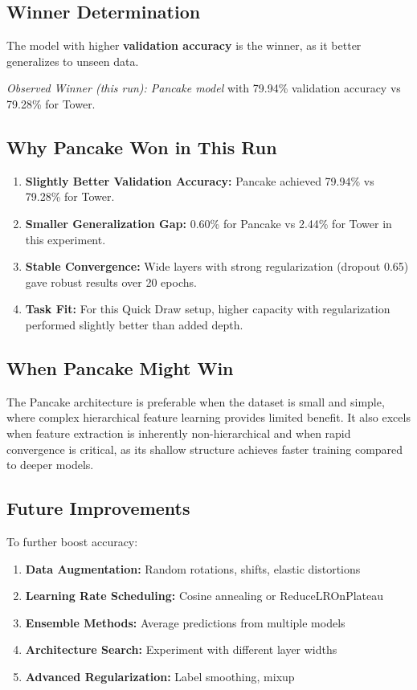 \documentclass[11pt]{article}
\begin{document}
\subsection{Winner Determination}
The model with higher \textbf{validation accuracy} is the winner, as it better generalizes to unseen data.

\textit{Observed Winner (this run): Pancake model} with 79.94\% validation accuracy vs 79.28\% for Tower.

\subsection{Why Pancake Won in This Run}
\begin{enumerate}
    \item \textbf{Slightly Better Validation Accuracy:} Pancake achieved 79.94\% vs 79.28\% for Tower.
    \item \textbf{Smaller Generalization Gap:} 0.60\% for Pancake vs 2.44\% for Tower in this experiment.
    \item \textbf{Stable Convergence:} Wide layers with strong regularization (dropout 0.65) gave robust results over 20 epochs.
    \item \textbf{Task Fit:} For this Quick Draw setup, higher capacity with regularization performed slightly better than added depth.
\end{enumerate}

\subsection{When Pancake Might Win}
The Pancake architecture is preferable when the dataset is small and simple, where complex hierarchical feature learning provides limited benefit. It also excels when feature extraction is inherently non-hierarchical and when rapid convergence is critical, as its shallow structure achieves faster training compared to deeper models.

\subsection{Future Improvements}
To further boost accuracy:
\begin{enumerate}
    \item \textbf{Data Augmentation:} Random rotations, shifts, elastic distortions
    \item \textbf{Learning Rate Scheduling:} Cosine annealing or ReduceLROnPlateau
    \item \textbf{Ensemble Methods:} Average predictions from multiple models
    \item \textbf{Architecture Search:} Experiment with different layer widths
    \item \textbf{Advanced Regularization:} Label smoothing, mixup
\end{enumerate}
\end{document}
